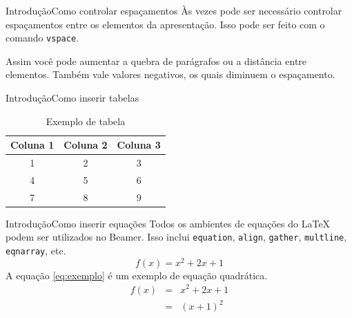 \documentclass[11pt]{beamer}
\begin{document}
        \begin{frame}{Introdução}{Como controlar espaçamentos}
            Às vezes pode ser necessário controlar espaçamentos entre os elementos
            da apresentação. Isso pode ser feito com o comando \texttt{vspace}.
            \vspace{1cm}

            Assim você pode aumentar a quebra de parágrafos ou a distância entre
            elementos. Também vale valores negativos, os quais diminuem o espaçamento.
        \end{frame}

        \begin{frame}{Introdução}{Como inserir tabelas}
            \begin{table}
                \centering
                \begin{tabular}{|c|c|c|}
                    \hline
                    \textbf{Coluna 1} & \textbf{Coluna 2} & \textbf{Coluna 3} \\
                    \hline
                    1 & 2 & 3 \\
                    4 & 5 & 6 \\
                    7 & 8 & 9 \\
                    \hline
                \end{tabular}
                \caption{Exemplo de tabela}
            \end{table}
        \end{frame}

        \begin{frame}{Introdução}{Como inserir equações}
            Todos os ambientes de equações do LaTeX podem ser utilizados no Beamer.
            Isso inclui \texttt{equation}, \texttt{align}, \texttt{gather}, \texttt{multline},
            \texttt{eqnarray}, etc.
            \begin{equation}
                \label{eq:exemplo}
                f(x) = x^2 + 2x + 1
            \end{equation}
            A equação \eqref{eq:exemplo} é um exemplo de equação quadrática.
            \begin{eqnarray}
                f(x) & = & x^2 + 2x + 1 \nonumber \\
                & = & (x + 1)^2
            \end{eqnarray}
        \end{frame}
\end{document}
